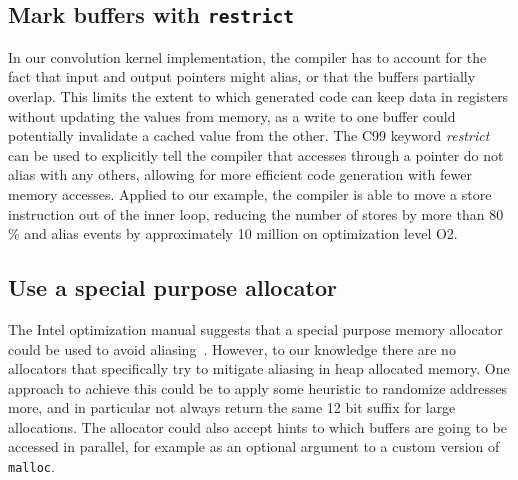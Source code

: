 \documentclass[10pt, conference, compsocconf]{IEEEtran}
\begin{document}
\subsection{Mark buffers with \texttt{restrict}}
In our convolution kernel implementation, the compiler has to account for the fact that input and output pointers might alias, or that the buffers partially overlap.
This limits the extent to which generated code can keep data in registers without updating the values from memory, as a write to one buffer could potentially invalidate a cached value from the other.
The C99 keyword \emph{restrict} can be used to explicitly tell the compiler that accesses through a pointer do not alias with any others, allowing for more efficient code generation with fewer memory accesses.
Applied to our example, the compiler is able to move a store instruction out of the inner loop, reducing the number of stores by more than 80 \% and alias events by approximately 10 million on optimization level O2.

\subsection{Use a special purpose allocator}
The Intel optimization manual suggests that a special purpose memory allocator could be used to avoid aliasing~\cite{OptimizationManual}. %
However, to our knowledge there are no allocators that specifically try to mitigate aliasing in heap allocated memory.
One approach to achieve this could be to apply some heuristic to randomize addresses more, and in particular not always return the same 12 bit suffix for large allocations.
The allocator could also accept hints to which buffers are going to be accessed in parallel, for example as an optional argument to a custom version of \texttt{malloc}.
\end{document}

